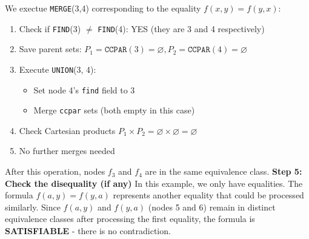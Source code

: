 \documentclass[a4paper]{article}
\theoremstyle{definition}
\begin{document}
We exectue \texttt{MERGE}(3,4) corresponding to the equality \( f(x,y) = f(y,x) \):
\begin{enumerate}
	\item Check if \texttt{FIND}(3) \( \neq \) \texttt{FIND}(4): YES (they are 3 and 4 respectively)
	\item Save parent sets: \( P_1 = \texttt{CCPAR}(3) = \varnothing, P_2 = \texttt{CCPAR}(4) = \varnothing \)   
	\item Execute \texttt{UNION}(3, 4):
	\begin{itemize}
		\item Set node 4's \texttt{find} field to 3 
		\item Merge \texttt{ccpar} sets (both empty in this case)
	\end{itemize}
	\item Check Cartesian products \( P_1 \times P_2 = \varnothing \times \varnothing = \varnothing \)   
	\item No further merges needed
\end{enumerate}
After this operation, nodes \( f_3 \) and \( f_4 \) are in the same equivalence class.
\vspace{1em}
\noindent
\newline
\textbf{Step 5: Check the disequality (if any)}
\vspace{1em}
\noindent
\newline
In this example, we only have equalities. The formula \( f(a,y) = f(y,a) \) represents another equality that could 
be processed similarly. Since \( f(a,y) \) and \( f(y,a) \) (nodes 5 and 6) remain in distinct equivalence classes after 
processing the first equality, the formula is \textbf{SATISFIABLE} - there is no contradiction.
\end{document}
